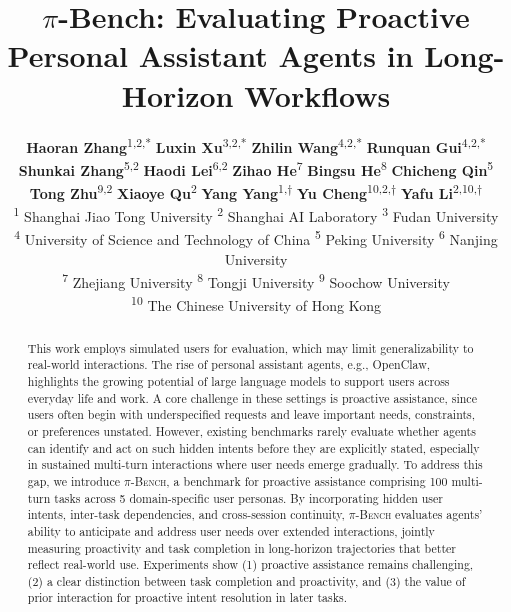 \documentclass{llmxive}
\title{$π$-Bench: Evaluating Proactive Personal Assistant Agents in Long-Horizon Workflows}
\author{\begin{minipage}{\textwidth}
\centering
\normalfont
\textbf{Haoran Zhang}\textsuperscript{1,2,*}\hspace{1em}
\textbf{Luxin Xu}\textsuperscript{3,2,*}\hspace{1em}
\textbf{Zhilin Wang}\textsuperscript{4,2,*}\hspace{1em}
\textbf{Runquan Gui}\textsuperscript{4,2,*}\\
\textbf{Shunkai Zhang}\textsuperscript{5,2}\hspace{1em}
\textbf{Haodi Lei}\textsuperscript{6,2}\hspace{1em}
\textbf{Zihao He}\textsuperscript{7}\hspace{1em}
\textbf{Bingsu He}\textsuperscript{8}\hspace{1em}
\textbf{Chicheng Qin}\textsuperscript{5}\\
\textbf{Tong Zhu}\textsuperscript{9,2}\hspace{1em}
\textbf{Xiaoye Qu}\textsuperscript{2}\hspace{1em}
\textbf{Yang Yang}\textsuperscript{1,$\dagger$}\hspace{1em}
\textbf{Yu Cheng}\textsuperscript{10,2,$\dagger$}\hspace{1em}
\textbf{Yafu Li}\textsuperscript{2,10,$\dagger$}
\\[0.6em]
{\small
\textsuperscript{1} Shanghai Jiao Tong University \quad
\textsuperscript{2} Shanghai AI Laboratory \quad
\textsuperscript{3} Fudan University \\
\textsuperscript{4} University of Science and Technology of China \quad
\textsuperscript{5} Peking University \quad
\textsuperscript{6} Nanjing University \\
\textsuperscript{7} Zhejiang University \quad
\textsuperscript{8} Tongji University  \quad
\textsuperscript{9} Soochow University \\
\textsuperscript{10} The Chinese University of Hong Kong
}
\end{minipage}}
\providecommand{\bench}{\textsc{$\pi$-Bench}}
\providecommand{\thefootnote}{\fnsymbol{footnote}}
\begin{document}
\maketitle
\begin{abstract}
This work employs simulated users for evaluation, which may limit generalizability to real-world interactions.
The rise of personal assistant agents, e.g., OpenClaw, highlights the growing potential of large language models to support users across everyday life and work. A core challenge in these settings is proactive assistance, since users often begin with underspecified requests and leave important needs, constraints, or preferences unstated. 
However, existing benchmarks rarely evaluate whether agents can identify and act on such hidden intents before they are explicitly stated, especially in sustained multi-turn interactions where user needs emerge gradually.
To address this gap, we introduce {\bench}, a benchmark for proactive assistance comprising 100 multi-turn tasks across 5 domain-specific user personas. By incorporating hidden user intents, inter-task dependencies, and cross-session continuity, {\bench} evaluates agents’ ability to anticipate and address user needs over extended interactions, jointly measuring proactivity and task completion in long-horizon trajectories that better reflect real-world use.
Experiments show (1) proactive assistance remains challenging, (2) a clear distinction between task completion and proactivity, and (3) the value of prior interaction for proactive intent resolution in later tasks.
\end{abstract}
\renewcommand{\thefootnote}{\fnsymbol{footnote}}




\end{document}
